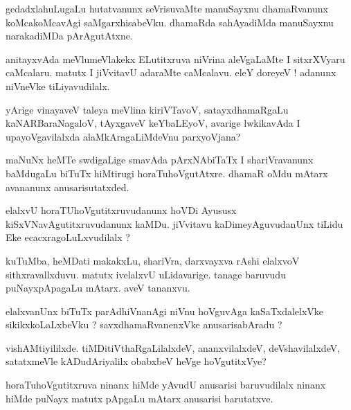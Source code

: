 \documentclass{article}
\begin{document}
\begin{mn}%
gedadxlahuLugaLu hutatvanunx seVrisuvaMte manuSayxnu dhamaRvanunx koMcakoMcavAgi 
saMgarxhisabeVku. dhamaRda sahAyadiMda manuSayxnu  narakadiMDa pArAgutAtxne.
\end{mn}

\begin{mn}%
anitayxvAda meVlumeVlakekx ELutitxruva niVrina aleVgaLaMte I sitxrXVyaru caMcalaru. matutx 
I jiVvitavU adaraMte caMcalavu. eleY doreyeV ! adanunx niVneVke tiLiyavudilalx.
\end{mn}

\begin{mn}%
yArige vinayaveV taleya meVlina kiriVTavoV, satayxdhamaRgaLu kaNARBaraNagaloV, tAyxgaveV 
keYbaLEyoV, avarige lwkikavAda I upayoVgavilalxda alaMkAragaLiMdeVnu parxyoVjana?
\end{mn}

\begin{mn}%
maNuNx heMTe swdigaLige smavAda pArxNAbiTaTx I shariVravanunx baMdugaLu biTuTx hiMtirugi 
horaTuhoVgutAtxre. dhamaR oMdu mAtarx avananunx anusarisutatxded.
\end{mn}

\begin{mn}%
elalxvU horaTUhoVgutitxruvudanunx hoVDi Ayususx kiSxVNavAgutitxruvudanunx kaMDu. jiVvitavu 
kaDimeyAguvudanUnx tiLidu Eke ecacxragoLuLxvudilalx ?
\end{mn}

\begin{mn}%
kuTuMba, heMDati makakxLu, shariVra, darxvayxva rAshi elalxvoV sithxravallxduvu. matutx 
ivelalxvU uLidavarige. tanage baruvudu  puNayxpApagaLu mAtarx. aveV tananxvu.
\end{mn}

\begin{mn}%
elalxvanUnx biTuTx parAdhiVnanAgi niVnu hoVguvAga kaSaTxdalelxVke sikikxkoLaLxbeVku ? 
savxdhamaRvanenxVke anusarisabAradu ?
\end{mn}

\begin{mn}%
vishAMtiyililxde. tiMDitiVthaRgaLilalxdeV, ananxvilalxdeV, deVshavilalxdeV, satatxmeVle 
kADudAriyalilx obabxbeV heVge hoVgutitxVye?
\end{mn}

\begin{mn}%
horaTuhoVgutitxruva ninanx hiMde yAvudU anusarisi baruvudilalx ninanx hiMde puNayx matutx 
pApgaLu mAtarx anusarisi barutatxve.
\end{mn}
\end{document}
